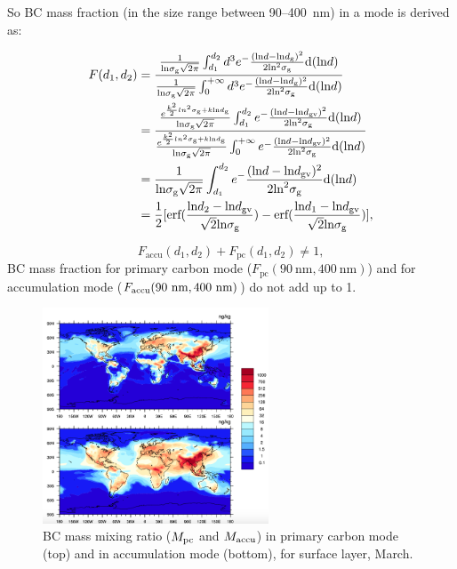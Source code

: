 \documentclass[11pt]{article}
\begin{document}
So BC mass fraction (in the size range between 90--400~nm)
in a mode is derived as:

\begin{align*}
F(d_{1}, d_{2}) &= \frac{\frac{1}{\text{ln}\sigma_{\text{g}}\sqrt{2\pi}}\int_{d_{1}}^{d_{2}}d^3e^-\frac{(\text{ln}d - \text{ln}d_{\rm g})^2}{2\text{ln}^2\sigma_{\text{g}}}\text{d}(\text{ln}d)}
{\frac{1}{\text{ln}\sigma_{\text{g}}\sqrt{2\pi}}\int_{0}^{+\infty}d^3e^-\frac{(\text{ln}d - \text{ln}d_{\rm g})^2}{2\text{ln}^2\sigma_{\text{g}}}\text{d}(\text{ln}d)}  \\
&=\frac{\frac{e^{\frac{k^2}{2}ln^2\sigma_{\rm g}+k\text{ln}d_{\rm g}}}{\text{ln}\sigma_{\text{g}}\sqrt{2\pi}}\int_{d_{1}}^{d_{2}}e^-\frac{(\text{ln}d - \text{ln}d_{\text{gv}})^2}{2\text{ln}^2\sigma_{\text{g}}}\text{d}(\text{ln}d)}{\frac{e^{\frac{k^2}{2}ln^2\sigma_{\rm g}+k\text{ln}d_{\rm g}}}{\text{ln}\sigma_{\text{g}}\sqrt{2\pi}}\int_{0}^{+\infty}e^-\frac{(\text{ln}d - \text{ln}d_{\text{gv}})^2}{2\text{ln}^2\sigma_{\text{g}}}\text{d}(\text{ln}d)}\\
&=\frac{1}{\text{ln}\sigma_{\text{g}}\sqrt{2\pi}}\int_{d_{1}}^{d_{2}}e^-\frac{(\text{ln}d - \text{ln}d_{\text{gv}})^2}{2\text{ln}^2\sigma_{\text{g}}}\text{d}(\text{ln}d) \\
&=\frac{1}{2}[\text{erf}(\frac{\text{ln}d_{2} - \text{ln}d_{\text{gv}}}{\sqrt{2}\text{ln}\sigma_{\rm g}})-\text{erf}(\frac{\text{ln}d_{1} - \text{ln}d_{\text{gv}}}{\sqrt{2}\text{ln}\sigma_{\rm g}})],
\end{align*}

\[F_{\text{accu}}(d_{1}, d_{2}) + F_{\text{pc}}(d_{1}, d_{2}) \neq 1,\]
BC mass fraction for primary carbon mode ($F_{\text{pc}}(90~\text{nm}, 400~\text{nm})$) and for accumulation mode ($F_{\text{accu}}(90~\rm nm, 400~\rm nm)$) do not add up to 1.


\begin{figure}[!h] 
	\begin{center}
		\includegraphics[width = 0.6\textwidth]{Rplot01}
		\caption[]{\label{fig_P1}BC mass mixing ratio ($M_{\rm pc}$ and $M_{\rm accu}$) in primary carbon mode (top) and in accumulation mode (bottom), for surface layer, March.}
	\end{center}
\end{figure}
\end{document}
